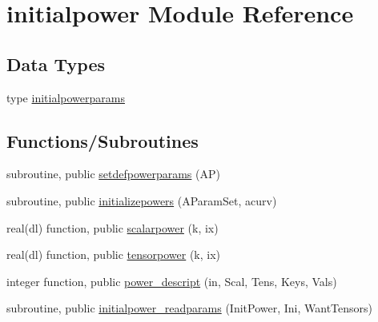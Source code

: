 \hypertarget{namespaceinitialpower}{}\section{initialpower Module Reference}
\label{namespaceinitialpower}
\subsection*{Data Types}
\begin{DoxyCompactItemize}
\item 
type \mbox{\hyperlink{structinitialpower_1_1initialpowerparams}{initialpowerparams}}
\end{DoxyCompactItemize}
\subsection*{Functions/\+Subroutines}
\begin{DoxyCompactItemize}
\item 
subroutine, public \mbox{\hyperlink{namespaceinitialpower_a0af6f4d15e7cc386f038c557a83256e1}{setdefpowerparams}} (AP)
\item 
subroutine, public \mbox{\hyperlink{namespaceinitialpower_aa7485ddfdf405ed8912c8070fef8af62}{initializepowers}} (A\+Param\+Set, acurv)
\item 
real(dl) function, public \mbox{\hyperlink{namespaceinitialpower_a2263ec918226f30880a9efbedf684be8}{scalarpower}} (k, ix)
\item 
real(dl) function, public \mbox{\hyperlink{namespaceinitialpower_aa1fdc1f3bcc69e61d7f690fa3ffd7f02}{tensorpower}} (k, ix)
\item 
integer function, public \mbox{\hyperlink{namespaceinitialpower_a44d725f2b2b68cb9ea810423c9b4d8c4}{power\+\_\+descript}} (in, Scal, Tens, Keys, Vals)
\item 
subroutine, public \mbox{\hyperlink{namespaceinitialpower_aad1ed45315709769eb35a28cbc8731f1}{initialpower\+\_\+readparams}} (Init\+Power, Ini, Want\+Tensors)
\end{DoxyCompactItemize}
